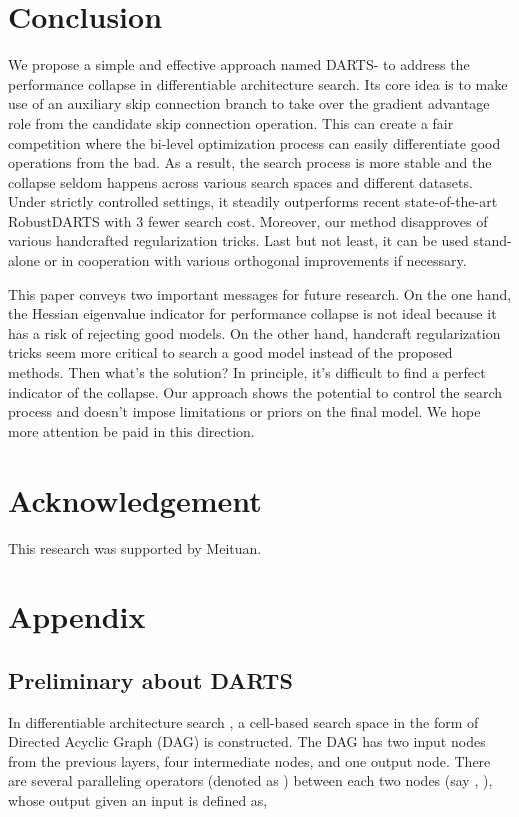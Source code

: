 \documentclass{article} \usepackage{iclr2021_conference,times}
\begin{document}
\section{Conclusion}
We propose a simple and effective approach named DARTS- to address the performance collapse in differentiable architecture search. Its core idea is to make use of an auxiliary skip connection branch to take over the gradient advantage role from the candidate skip connection operation. This can create a fair competition where the bi-level optimization process can  easily differentiate good operations from the bad. As a result, the search process is more stable and the collapse seldom happens across various search spaces and different datasets. 
Under strictly controlled settings, it steadily outperforms recent state-of-the-art RobustDARTS \citep{zela2020understanding}  with 3 fewer search cost.
Moreover, our method disapproves of various handcrafted regularization tricks. Last but not least, it can be used stand-alone or in cooperation with various orthogonal improvements if necessary.

This paper conveys two important messages for future research. On the one hand, the Hessian eigenvalue indicator for performance collapse \citep{zela2020understanding,chen2020stabilizing} is not ideal because it has a risk of rejecting good models. On the other hand, handcraft regularization tricks \citep{chen2019progressive} seem more critical to search a good model instead of the proposed methods.  Then what's the solution? In principle, it's difficult to find a perfect indicator of the collapse. Our approach shows the potential to control the search process and doesn't impose limitations or priors on the final model.  We hope more attention be paid in this direction.

\section{Acknowledgement}
This research was supported by Meituan.



\clearpage
\appendix
\section{Appendix}
\subsection{Preliminary about DARTS}\label{app:prelim}
In differentiable architecture search \citep{liu2018darts}, a cell-based search space in the form of Directed Acyclic Graph (DAG) is constructed. The DAG has two input nodes from the previous layers, four intermediate nodes, and one output node. There are several paralleling operators (denoted as ) between each two nodes (say , ), whose output  given an input  is defined as,
\end{document}
